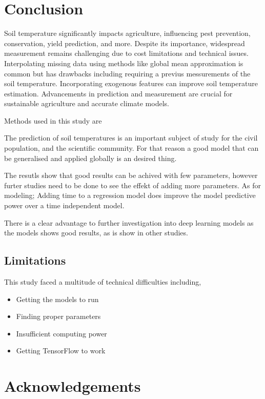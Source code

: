 \section{Conclusion}


Soil temperature significantly impacts agriculture, influencing pest prevention, conservation, yield prediction, and more. Despite its importance, widespread measurement remains challenging due to cost limitations and technical issues. Interpolating missing data using methods like global mean approximation is common but has drawbacks including requiring a previus messurements of the soil temperature. Incorporating exogenous features can improve soil temperature estimation. Advancements in prediction and measurement are crucial for sustainable agriculture and accurate climate models.

Methods used in this study are 

The prediction of soil temperatures is an important subject of study for the civil population, and the scientific community. For that reason a good model that can be generalised and applied globally is an desired thing.

The resutls show that good results can be achived with few parameters, however furter studies need to be done to see the effekt of adding more parameters. As for modeling; Adding time to a regression model does improve the model predictive power over a time independent model. 

There is a clear advantage to further investigation into deep learning models as the models shows good results, as is show in other studies\cite{feng_estimation_2019,li_attention-aware_2022,li_modeling_2020}. 

\subsection{Limitations}

This study faced a multitude of technical difficulties including,
\begin{itemize}
	\item Getting the models to run
	\item Finding proper parameters
	\item Insufficient computing power
	\item Getting TensorFlow to work
\end{itemize}

\section{Acknowledgements}

